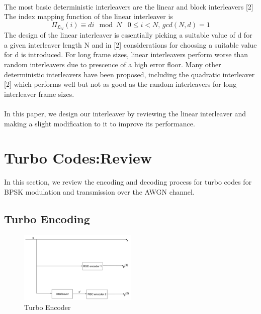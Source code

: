 \documentclass[twocolumn]{article}
\begin{document}
\paragraph{}
The most basic deterministic interleavers are the linear and block interleavers [2]
The index mapping function of the linear interleaver is 
$$ \Pi_{\mathfrak{L}_N}(i) \equiv di \mod N \,\,\,\,\, 0 \leq i < N, \, gcd(N,d)=1$$
The design of the linear interleaver is essentially picking a suitable value of d for a
given interleaver length N and in [2] considerations for choosing a suitable 
value for d is introduced. For long frame sizes, linear interleavers perform worse
than random interleavers due to prescence of a high error floor. Many other 
deterministic interleavers have been proposed, including the quadratic interleaver
[2] which performs well but not as good as the random interleavers for long
interleaver frame sizes. 

\paragraph{}
In this paper, we design our interleaver by reviewing the linear interleaver and making
a slight modification to it to improve its performance.

\section{Turbo Codes:Review}
In this section, we review the encoding and decoding process for turbo codes for BPSK
modulation and transmission over the AWGN channel.
	
\subsection{Turbo Encoding}

\begin{figure}[h!]
\centering
		\includegraphics[width=0.5\textwidth]{TurboEncoder.pdf}
		\caption{Turbo Encoder}
		\label{TC}
		\end{figure}
	
\end{document}
